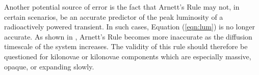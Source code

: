 \documentclass[twocolumn]{aastex63}
\begin{document}
Another potential source of error is the fact that Arnett's Rule may not, in certain scenarios, be an accurate predictor of the peak luminosity of a radioactively powered transient. In such cases, Equation (\ref{eqn:lum}) is no longer accurate. As shown in \cite{khatami19}, Arnett's Rule becomes more inaccurate as the diffusion timescale of the system increases. The validity of this rule should therefore be questioned for kilonovae or kilonovae components which are especially massive, opaque, or expanding slowly.  

\begin{figure} [!ht]
\end{figure}
\end{document}
